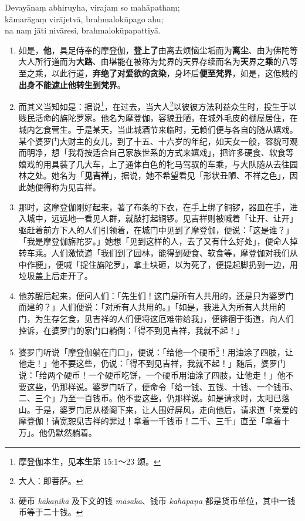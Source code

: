 Devayānaṃ abhiruyha, virajaṃ so mahāpathaṃ;\\
kāmarāgaṃ virājetvā, brahmalokūpago ahu;\\
na naṃ jāti nivāresi, brahmalokūpapattiyā. %

\begin{enumerate}\item 如是，\textbf{他}，具足侍奉的摩登伽，\textbf{登上了}由离去烦恼尘垢而为\textbf{离尘}、由为佛陀等大人所行道而为\textbf{大路}、由堪能在被称为梵界的天界存续而名为\textbf{天}界之\textbf{乘}的八等至之乘，以此行道，\textbf{弃绝了对爱欲的贪染}，身坏后\textbf{便至梵界}，如是，这低贱的\textbf{出身不能遮止他转生到梵界}。
\item 而其义当知如是：据说\footnote{摩登伽本生，见\textbf{本生}第 15:1～23 颂。}，在过去，当大人\footnote{大人：即菩萨。}以彼彼方法利益众生时，投生于以贱民活命的旃陀罗家。他名为摩登伽，容貌丑陋，在城外毛皮的棚屋居住，在城内乞食营生。于是某天，当此城酒节来临时，无赖们便与各自的随从嬉戏。某个婆罗门大财主的女儿，到了十五、十六岁的年纪，如天女一般，容貌可观而明净，想「我将按适合自己家族世系的方式来嬉戏」，把许多硬食、软食等嬉戏的用具装了几大车，上了通体白色的牝马驾驭的车乘，与大队随从去往园林之处。她名为「\textbf{见吉祥}」，据说，她不希望看见「形状丑陋、不祥之色」，因此她便得称为见吉祥。
\item 那时，这摩登伽刚好起来，著了布条的下衣，在手上绑了铜锣，器皿在手，进入城中，远远地一看见人群，就敲打起铜锣。见吉祥则被喊着「让开、让开」驱赶着前方下人的人们引领着，在城门中见到了摩登伽，便说：「这是谁？」「我是摩登伽旃陀罗。」她想「见到这样的人，去了又有什么好处」，便命人掉转车乘。人们激愤道「我们到了园林，能得到硬食、软食等，摩登伽对我们从中作梗」，便喊「捉住旃陀罗」，拿土块砸，以为死了，便提起脚扔到一边，用垃圾盖上后走开了。
\item 他苏醒后起来，便问人们：「先生们！这门是所有人共用的，还是只为婆罗门而建的？」人们便说：「对所有人共用的。」「如是，我进入为所有人共用的门，为生存乞食，见吉祥的人们便将这厄难带给我」，便徘徊于街道，向人们控诉，在婆罗门的家门口躺倒：「得不到见吉祥，我就不起！」
\item 婆罗门听说「摩登伽躺在门口」，便说：「给他一个硬币\footnote{硬币 \textit{kākaṇikā} 及下文的钱 \textit{māsaka}、钱币 \textit{kahāpaṇa} 都是货币单位，其中一钱币等于二十钱。}！用油涂了四肢，让他走！」他不要这些，仍说：「得不到见吉祥，我就不起！」随后，婆罗门说：「给两个硬币！一个硬币吃饼，一个硬币用油涂了四肢，让他走！」他不要这些，仍那样说。婆罗门听了，便命令「给一钱、五钱、十钱、一个钱币、二、三个」乃至一百钱币。他不要这些，仍那样说。如是请求时，太阳已落山。于是，婆罗门尼从楼阁下来，让人围好屏风，走向他后，请求道「亲爱的摩登伽！请宽恕见吉祥的罪过！拿着一千钱币！二千、三千」直至「拿着十万」。他仍默然躺着。

\end{enumerate}
